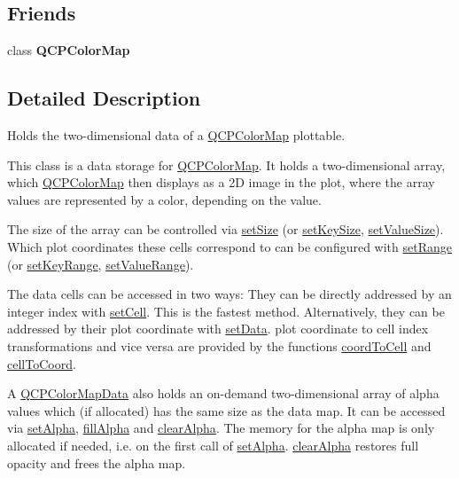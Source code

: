 \subsection*{Friends}
\begin{DoxyCompactItemize}
\item 
\mbox{\label{classQCPColorMapData_afa9d9eab63af3e6f20f882c8d7cc9f20}} 
class {\bfseries Q\+C\+P\+Color\+Map}
\end{DoxyCompactItemize}


\subsection{Detailed Description}
Holds the two-\/dimensional data of a \hyperlink{classQCPColorMap}{Q\+C\+P\+Color\+Map} plottable. 

This class is a data storage for \hyperlink{classQCPColorMap}{Q\+C\+P\+Color\+Map}. It holds a two-\/dimensional array, which \hyperlink{classQCPColorMap}{Q\+C\+P\+Color\+Map} then displays as a 2D image in the plot, where the array values are represented by a color, depending on the value.

The size of the array can be controlled via \hyperlink{classQCPColorMapData_a0d9ff35c299d0478b682bfbcdd9c097e}{set\+Size} (or \hyperlink{classQCPColorMapData_ac7ef70e383aface34b44dbde49234b6b}{set\+Key\+Size}, \hyperlink{classQCPColorMapData_a0893c9e3914513048b45e3429ffd16f2}{set\+Value\+Size}). Which plot coordinates these cells correspond to can be configured with \hyperlink{classQCPColorMapData_aad9c1c7c703c1339489fc730517c83d4}{set\+Range} (or \hyperlink{classQCPColorMapData_a0738c485f3c9df9ea1241b7a8bb6a86e}{set\+Key\+Range}, \hyperlink{classQCPColorMapData_ada1b2680ba96a5f4175b6d341cf75d23}{set\+Value\+Range}).

The data cells can be accessed in two ways\+: They can be directly addressed by an integer index with \hyperlink{classQCPColorMapData_a8e75eaf8746596319032a93f3d2d0683}{set\+Cell}. This is the fastest method. Alternatively, they can be addressed by their plot coordinate with \hyperlink{classQCPColorMapData_afd2083ccfd6987ec94aa7ef8e91ca39a}{set\+Data}. plot coordinate to cell index transformations and vice versa are provided by the functions \hyperlink{classQCPColorMapData_aca5b29e0ca2f299c9060fc6e1f74d0c8}{coord\+To\+Cell} and \hyperlink{classQCPColorMapData_af1a36385c78ab624cd617065602408b6}{cell\+To\+Coord}.

A \hyperlink{classQCPColorMapData}{Q\+C\+P\+Color\+Map\+Data} also holds an on-\/demand two-\/dimensional array of alpha values which (if allocated) has the same size as the data map. It can be accessed via \hyperlink{classQCPColorMapData_aaf7de5b34c58f38d8f4c1ceb064a876c}{set\+Alpha}, \hyperlink{classQCPColorMapData_a93e2a549d7702bc849cd48a585294657}{fill\+Alpha} and \hyperlink{classQCPColorMapData_a14d08b9c3720cd719400079b86d3906b}{clear\+Alpha}. The memory for the alpha map is only allocated if needed, i.\+e. on the first call of \hyperlink{classQCPColorMapData_aaf7de5b34c58f38d8f4c1ceb064a876c}{set\+Alpha}. \hyperlink{classQCPColorMapData_a14d08b9c3720cd719400079b86d3906b}{clear\+Alpha} restores full opacity and frees the alpha map.

